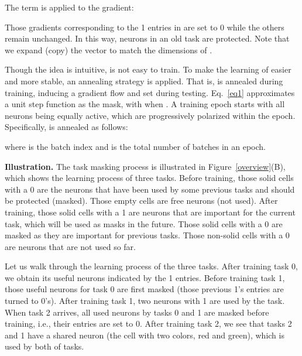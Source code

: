 \documentclass{article}
\begin{document}
The term  is applied to the gradient:

Those gradients corresponding to the 1 entries in  are set to 0 while the others remain unchanged. 
In this way, neurons in an old task are protected. 
Note that we expand (copy) the vector  to match the dimensions of .

Though the idea is intuitive,  is not easy to train. To make the learning of  easier and more stable, an annealing strategy is applied. That is,  is annealed during training, inducing a gradient flow and set  during testing. {\color{black}Eq.~\ref{eq1} approximates a unit step function as the mask, with  when . 
A training epoch starts with all neurons being equally active, which are progressively polarized within the epoch. Specifically,  is annealed as follows}:

where  is the batch index and  is the total number of batches in an epoch.
\fi

\textbf{Illustration.} The task masking process is illustrated in Figure~\ref{overview}(B), which shows the learning process of three tasks. Before training, those solid cells with a 0 are the neurons that have been used by some previous tasks and should be protected (masked). Those empty cells are free neurons (not used). After training, those solid cells with a 1 are neurons that are important for the current task, which will be used as masks in the future. Those solid cells with a 0 are masked as they are important for previous tasks. Those non-solid cells with a 0 are neurons that are not used so far.  

Let us walk through the learning process of the three tasks. After training task 0, we obtain its useful neurons indicated by the 1 entries. Before training task 1, those useful neurons for task 0 are first masked (those previous 1's entries are turned to 0's). After training task 1, two neurons with 1 are used by the task. When task 2 arrives, all used neurons by tasks 0 and 1 are masked before training, i.e., their entries are set to 0. After training task 2, we see that tasks 2 and 1 have a shared neuron (the cell with two colors, red and green), which is used by both of tasks. 
\end{document}
